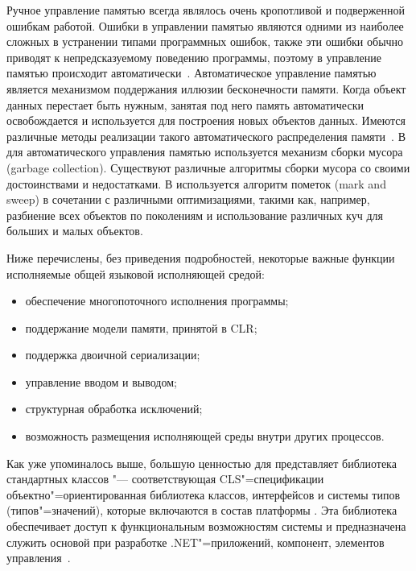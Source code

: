 Ручное управление памятью всегда являлось очень кропотливой и подверженной ошибкам работой.
Ошибки в управлении памятью являются одними из наиболее сложных в устранении типами программных ошибок, также эти ошибки обычно приводят к непредсказуемому поведению программы, поэтому в \dotnet{} управление памятью происходит автоматически~\cite[с.~505\,--\,506]{richter_2012_en}.
Автоматическое управление памятью является механизмом поддержания иллюзии бесконечности памяти.
Когда объект данных перестает быть нужным, занятая под него память автоматически освобождается и используется для построения новых объектов данных.
Имеются различные методы реализации такого автоматического распределения памяти~\cite[с.~489]{sicp_2006_ru}.
В~\dotnet{} для автоматического управления памятью используется механизм сборки мусора (garbage collection).
Существуют различные алгоритмы сборки мусора со своими достоинствами и недостатками. 
В \dotnet{} используется алгоритм пометок (mark and sweep) в сочетании с различными оптимизациями, такими как, например, разбиение всех объектов по поколениям и использование различных куч для больших и малых объектов.

Ниже перечислены, без приведения подробностей, некоторые важные функции исполняемые общей языковой исполняющей средой:
\begin{itemize}
  \item обеспечение многопоточного исполнения программы;
  \item поддержание модели памяти, принятой в CLR;
  \item поддержка двоичной сериализации;
  \item управление вводом и выводом;
  \item структурная обработка исключений;
  \item возможность размещения исполняющей среды внутри других процессов.
\end{itemize}

Как уже упоминалось выше, большую ценностью для \dotnet{} представляет библиотека стандартных классов "--- соответствующая CLS"=спецификации объектно"=ориентированная библиотека классов, интерфейсов и системы типов (типов"=значений), которые включаются в состав платформы \dotnet{}.
Эта библиотека обеспечивает доступ к функциональным возможностям системы и предназначена служить основой при разработке .NET"=приложений, компонент, элементов управления~\cite{marchenko_2007}.



